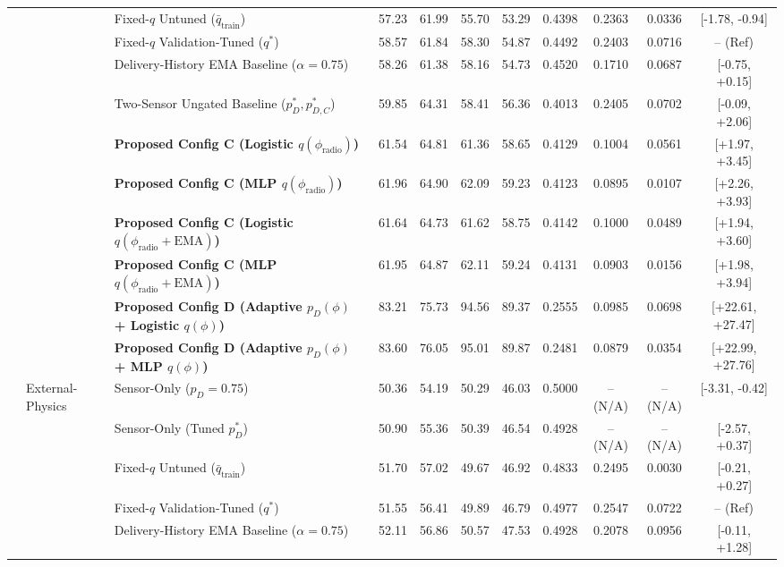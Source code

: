 \begin{table}[!t]
\begin{tabular}{lllcccccccc}
 &  & Fixed-$q$ Untuned ($\bar{q}_{\text{train}}$) & 57.23 & 61.99 & 55.70 & 53.29 & 0.4398 & 0.2363 & 0.0336 & [-1.78, -0.94] \\
 &  & Fixed-$q$ Validation-Tuned ($q^*$) & 58.57 & 61.84 & 58.30 & 54.87 & 0.4492 & 0.2403 & 0.0716 & -- (Ref) \\
 &  & Delivery-History EMA Baseline ($\alpha=0.75$) & 58.26 & 61.38 & 58.16 & 54.73 & 0.4520 & 0.1710 & 0.0687 & [-0.75, +0.15] \\
 &  & Two-Sensor Ungated Baseline ($p_D^*, p_{D,C}^*$) & 59.85 & 64.31 & 58.41 & 56.36 & 0.4013 & 0.2405 & 0.0702 & [-0.09, +2.06] \\
 &  & \textbf{Proposed Config C (Logistic $q(\phi_{\text{radio}})$)} & 61.54 & 64.81 & 61.36 & 58.65 & 0.4129 & 0.1004 & 0.0561 & [+1.97, +3.45] \\
 &  & \textbf{Proposed Config C (MLP $q(\phi_{\text{radio}})$)} & 61.96 & 64.90 & 62.09 & 59.23 & 0.4123 & 0.0895 & 0.0107 & [+2.26, +3.93] \\
 &  & \textbf{Proposed Config C (Logistic $q(\phi_{\text{radio}}+\text{EMA})$)} & 61.64 & 64.73 & 61.62 & 58.75 & 0.4142 & 0.1000 & 0.0489 & [+1.94, +3.60] \\
 &  & \textbf{Proposed Config C (MLP $q(\phi_{\text{radio}}+\text{EMA})$)} & 61.95 & 64.87 & 62.11 & 59.24 & 0.4131 & 0.0903 & 0.0156 & [+1.98, +3.94] \\
 &  & \textbf{Proposed Config D (Adaptive $p_D(\phi)$ + Logistic $q(\phi)$)} & 83.21 & 75.73 & 94.56 & 89.37 & 0.2555 & 0.0985 & 0.0698 & [+22.61, +27.47] \\
 &  & \textbf{Proposed Config D (Adaptive $p_D(\phi)$ + MLP $q(\phi)$)} & 83.60 & 76.05 & 95.01 & 89.87 & 0.2481 & 0.0879 & 0.0354 & [+22.99, +27.76] \\
\midrule
 & External-Physics & Sensor-Only ($p_D=0.75$) & 50.36 & 54.19 & 50.29 & 46.03 & 0.5000 & -- (N/A) & -- (N/A) & [-3.31, -0.42] \\
 &  & Sensor-Only (Tuned $p_D^*$) & 50.90 & 55.36 & 50.39 & 46.54 & 0.4928 & -- (N/A) & -- (N/A) & [-2.57, +0.37] \\
 &  & Fixed-$q$ Untuned ($\bar{q}_{\text{train}}$) & 51.70 & 57.02 & 49.67 & 46.92 & 0.4833 & 0.2495 & 0.0030 & [-0.21, +0.27] \\
 &  & Fixed-$q$ Validation-Tuned ($q^*$) & 51.55 & 56.41 & 49.89 & 46.79 & 0.4977 & 0.2547 & 0.0722 & -- (Ref) \\
 &  & Delivery-History EMA Baseline ($\alpha=0.75$) & 52.11 & 56.86 & 50.57 & 47.53 & 0.4928 & 0.2078 & 0.0956 & [-0.11, +1.28] \\

\end{tabular}
\end{table}
